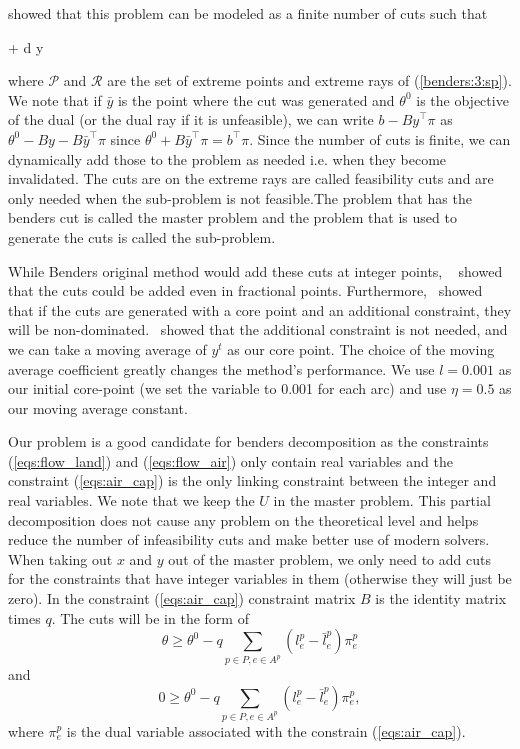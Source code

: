 \documentclass{article}
\begin{document}
	
	\cite{bendersPartitioningProceduresSolving1962} showed that this problem can be modeled as a finite number of cuts such that
    \begin{mini!}
        {}{\theta + d \cdot y}{}{}
    \end{mini!}
    where $\mathcal{P}$ and $\mathcal{R}$ are the set of extreme points and extreme rays of (\ref{benders:3:sp}). We note that if $\bar{y}$ is the point where the cut was generated and $\theta^0$ is the objective of the dual (or the dual ray if it is unfeasible), we can write ${b - By}^\top \pi$ as $\theta^0 - {By - B\bar{y}}^\top \pi$ since $\theta^0 + {B\bar{y}}^\top \pi= b^\top \pi$. Since the number of cuts is finite, we can dynamically add those to the problem as needed i.e. when they become invalidated. The cuts are on the extreme rays are called feasibility cuts and are only needed when the sub-problem is not feasible.The problem that has the benders cut is called the master problem and the problem that is used to generate the cuts is called the sub-problem.


    While Benders original method would add these cuts at integer points,
	~\cite{mcdanielModifiedBendersPartitioning1977} showed that the cuts could be added even in fractional points. 
	Furthermore,~\cite{magnantiAcceleratingBendersDecomposition1981} showed that if the cuts are generated with a core point and an additional constraint, 
	they will be non-dominated.~\cite{papadakosPracticalEnhancementsMagnanti2008} showed that the additional constraint is not needed, and we can take a moving average of $y^t$ as our core point. The choice of the moving average coefficient greatly changes the method's performance. We use $l=0.001$ as our initial core-point (we set the variable to 0.001 for each arc) and use $\eta=0.5$ as our moving average constant.


    Our problem is a good candidate for benders decomposition as the constraints (\ref{eqs:flow_land}) and (\ref{eqs:flow_air}) only contain real variables and the constraint (\ref{eqs:air_cap}) is the only linking constraint between the integer and real variables. We note that we keep the $U$ in the master problem. This partial decomposition does not cause any problem on the theoretical level and helps reduce the number of infeasibility cuts and make better use of modern solvers.
    When taking out $x$ and $y$ out of the master problem, we only need to add cuts for the constraints that have integer variables in them (otherwise they will just be zero). In the constraint (\ref{eqs:air_cap}) constraint matrix $B$ is the identity matrix times $q$. The cuts will be in the form of
    \begin{equation}
        \theta \geq \theta^0 - q\sum_{p \in P, e \in A^p} (l^p_e - \bar{l}^p_e) \pi^p_e
    \end{equation}
    and
    \begin{equation}
        0 \geq \theta^0 - q\sum_{p \in P, e \in A^p} (l^p_e - \bar{l}^p_e) \pi^p_e,
    \end{equation}
    where $ \pi^p_e$ is the dual variable associated with the constrain (\ref{eqs:air_cap}).
\end{document}
